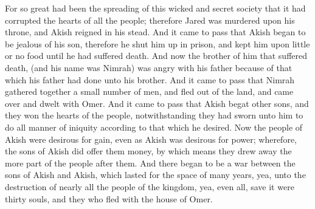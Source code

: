 For so great had been the spreading of this wicked and secret society that it had corrupted the hearts of all the people; therefore Jared was murdered upon his throne, and Akish reigned in his stead.
\bverse \iffalse And it came to pass that Akish began to be jealous of his son, therefore he shut him up in prison, and kept him upon little or no food until he had suffered death. \fi
And it came to pass that Akish began to be jealous of his son, therefore he shut him up in prison, and kept him upon little or no food until he had suffered death.
\bverse \iffalse And now the brother of him that suffered death, (and his name was Nimrah) was angry with his father because of that which his father had done unto his brother. \fi
And now the brother of him that suffered death, (and his name was Nimrah) was angry with his father because of that which his father had done unto his brother.
\bverse \iffalse And it came to pass that Nimrah gathered together a small number of men, and fled out of the land, and came over and dwelt with Omer. \fi
And it came to pass that Nimrah gathered together a small number of men, and fled out of the land, and came over and dwelt with Omer.
\bverse \iffalse And it came to pass that Akish begat other sons, and they won the hearts of the people, notwithstanding they had sworn unto him to do all manner of iniquity according to that which he desired. \fi
And it came to pass that Akish begat other sons, and they won the hearts of the people, notwithstanding they had sworn unto him to do all manner of iniquity according to that which he desired.
\bverse \iffalse Now the people of Akish were desirous for gain, even as Akish was desirous for power; wherefore, the sons of Akish did offer them money, by which means they drew away the more part of the people after them. \fi
Now the people of Akish were desirous for gain, even as Akish was desirous for power; wherefore, the sons of Akish did offer them money, by which means they drew away the more part of the people after them.
\bverse \iffalse And there began to be a war between the sons of Akish and Akish, which lasted for the space of many years, yea, unto the destruction of nearly all the people of the kingdom, yea, even all, save it were thirty souls, and they who fled with the house of Omer. \fi
And there began to be a war between the sons of Akish and Akish, which lasted for the space of many years, yea, unto the destruction of nearly all the people of the kingdom, yea, even all, save it were thirty souls, and they who fled with the house of Omer.
